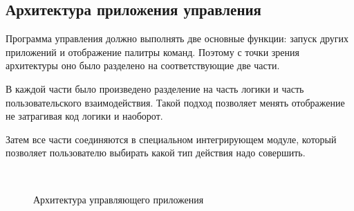 \iffalse
\begin{enumerate}
    \item Перехват функции создания элемента интерфейса
    \item Оповещение о создании элемента
    \item Вызов оригинальной функции графической библиотеки
    \item Отображение элемента управления
    \item Передача информации об элементе приложению управления
    \item Отображение палитры команд
    \item Выбор команды
    \item Вызов функции для выполнения команды
    \item Передача команды к выполнению
    \item Вызов функции активации окна целевого приложения
    \item Активация окна
    \item Перехват функции обработки события
    \item Вызов функции обработки события
    \item Вызов функции для выполнения команды
    \item Выполнение команды
\end{enumerate}

\begin{figure}
	\centering
	 \\
	\caption{Общий обзор архитектуры}\label{fig:arch}
\end{figure}

\fi

\subsection{Архитектура приложения управления}

Программа управления должно выполнять две основные функции: запуск других
приложений и отображение палитры команд. Поэтому с точки зрения архитектуры оно
было разделено на соответствующие две части. 

В каждой части было произведено разделение на часть логики и часть 
пользовательского взаимодействия. Такой подход позволяет менять отображение не 
затрагивая код логики и наоборот.

Затем все части соединяются в специальном интегрирующем модуле, который
позволяет пользователю выбирать какой тип действия надо совершить.

\begin{figure}[h]
	\centering
	 \\
	\caption{Архитектура управляющего приложения}\label{fig:ctrl_arch}
\end{figure}

